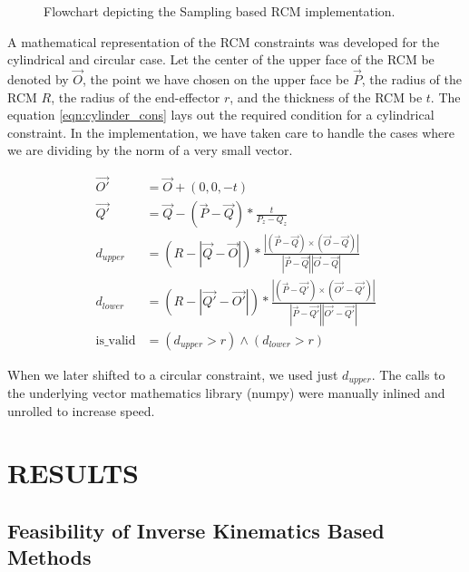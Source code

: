 \documentclass[BTech]{iitmdiss}
\begin{document}
    \begin{figure}
        \centering

        

        \caption{Flowchart depicting the Sampling based RCM implementation.}
        \label{fig:sampling_flowchart}
    \end{figure}

    A mathematical representation of the RCM constraints was developed for the cylindrical and circular case.
    Let the center of the upper face of the RCM be denoted by $\vec{O}$, the point we have chosen on the upper face be $\vec{P}$,
    the radius of the RCM $R$, the radius of the end-effector $r$, and the thickness of the RCM be $t$.
    The equation \ref{eqn:cylinder_cons} lays out the required condition for a cylindrical constraint.
    In the implementation, we have taken care to handle the cases where we are dividing by the norm of a very small vector.

    \begin{align}
        \vec{O'} &= \vec{O} + (0, 0, -t) \\
        \vec{Q'} &= \vec{Q} - (\vec{P} - \vec{Q}) * \frac{t}{P_z - Q_z} \\
        d_{upper} &= (R - |\vec{Q} - \vec{O}|) * \frac{|(\vec{P} - \vec{Q}) \times (\vec{O} - \vec{Q})|}{|\vec{P} - \vec{Q}| |\vec{O} - \vec{Q}|} \\
        d_{lower} &= (R - |\vec{Q'} - \vec{O'}|) * \frac{|(\vec{P} - \vec{Q'}) \times (\vec{O'} - \vec{Q'})|}{|\vec{P} - \vec{Q'}| |\vec{O'} - \vec{Q'}|} \\
        \text{is\_valid} &= (d_{upper} > r) \land (d_{lower} > r)\label{eqn:cylinder_cons}
    \end{align}

    When we later shifted to a circular constraint, we used just $d_{upper}$.
    The calls to the underlying vector mathematics library (numpy) were manually inlined and unrolled to increase speed.


    \chapter{RESULTS}\label{ch:results}


    \section{Feasibility of Inverse Kinematics Based Methods}\label{sec:flood_fill}
\end{document}
